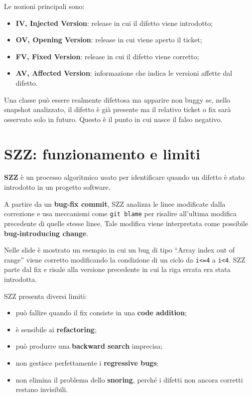 Le nozioni principali sono:

\begin{itemize}
    \item \textbf{IV, Injected Version}: release in cui il difetto viene introdotto;
    \item \textbf{OV, Opening Version}: release in cui viene aperto il ticket;
    \item \textbf{FV, Fixed Version}: release in cui il difetto viene corretto;
    \item \textbf{AV, Affected Version}: informazione che indica le versioni affette dal difetto.
\end{itemize}

\begin{notaprof}
Una classe può essere realmente difettosa ma apparire non buggy se, nello snapshot analizzato, il difetto è già presente ma il relativo ticket o fix sarà osservato solo in futuro. Questo è il punto in cui nasce il falso negativo.
\end{notaprof}

\section{SZZ: funzionamento e limiti}

\textbf{SZZ} è un processo algoritmico usato per identificare quando un difetto è stato introdotto in un progetto software.

A partire da un \textbf{bug-fix commit}, SZZ analizza le linee modificate dalla correzione e usa meccanismi come \texttt{git blame} per risalire all'ultima modifica precedente di quelle stesse linee. Tale modifica viene interpretata come possibile \textbf{bug-introducing change}.

\begin{notaslide}
Nelle slide è mostrato un esempio in cui un bug di tipo ``Array index out of range'' viene corretto modificando la condizione di un ciclo da \texttt{i<=4} a \texttt{i<4}. SZZ parte dal fix e risale alla versione precedente in cui la riga errata era stata introdotta.
\end{notaslide}

SZZ presenta diversi limiti:

\begin{itemize}
    \item può fallire quando il fix consiste in una \textbf{code addition};
    \item è sensibile ai \textbf{refactoring};
    \item può produrre una \textbf{backward search} imprecisa;
    \item non gestisce perfettamente i \textbf{regressive bugs};
    \item non elimina il problema dello \textbf{snoring}, perché i difetti non ancora corretti restano invisibili.
\end{itemize}

